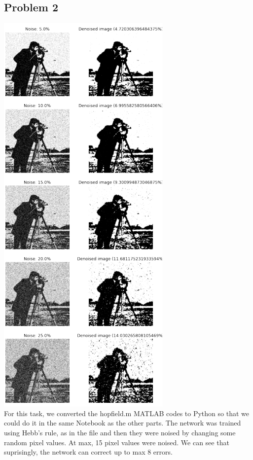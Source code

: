 \documentclass[conference]{IEEEtran}
\begin{document}
\subsection{Problem 2}
\includegraphics{Screenshot 2023-02-25 142547.png}\\
For this task, we converted the hopfield.m MATLAB codes
to Python so that we could do it in the same Notebook as the other parts. The network was trained using Hebb’s rule, as in the file and then they were noised by changing some random pixel values. At max, 15 pixel values were noised. We can see that suprisingly, the network can correct up to max 8 errors.
\end{document}
